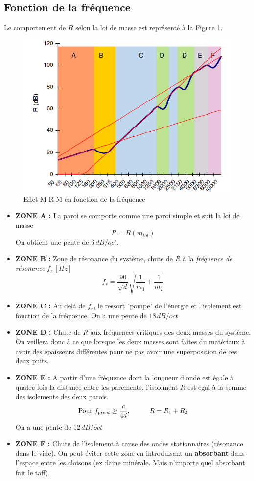 \documentclass[11pt]{report}
\begin{document}
\subsection{Fonction de la fréquence}
Le comportement de $R$ selon la loi de masse est représenté à la Figure \ref{f2}.

\begin{figure}[ht]
\centering
\includegraphics[width=0.8\linewidth]{f2}
\caption{Effet M-R-M en fonction de la fréquence}
\label{f2}
\end{figure}

\begin{itemize}
\item \textbf{ZONE A :} La paroi se comporte comme une paroi simple et suit la loi de masse
$$R=R(m_{tot})$$
On obtient une pente de $6\,dB/oct$.

\item \textbf{ZONE B :} Zone de résonance du système, chute de $R$ à la \textit{fréquence de résonance} $f_r\,[Hz]$
$$f_r =\frac{90}{\sqrt{d}}\sqrt{\frac{1}{m_1}+\frac{1}{m_2}}$$

\item \textbf{ZONE C :} Au delà de $f_r$, le ressort "pompe" de l'énergie et l'isolement est fonction de la fréquence. On a une pente de $18\,dB/oct$

\item \textbf{ZONE D :} Chute de $R$ aux fréquences critiques des deux masses du système. On veillera donc à ce que lorsque les deux masses sont faites du matériaux à avoir des épaisseurs différentes pour ne pas avoir une superposition de ces deux puits.

\item \textbf{ZONE E :} A partir d'une fréquence dont la longueur d'onde est égale à quatre fois la distance entre les parements, l'isolement $R$ est égal à la somme des isolements des deux parois.
$$\textup{Pour } f_{pivot} \ge \frac{c}{4d},\hspace{1cm} R = R_1+R_2$$
On a une pente de $12\,dB/oct$

\item \textbf{ZONE F :} Chute de l'isolement à cause des ondes stationnaires (résonance dans le vide). On peut éviter cette zone en introduisant un \textbf{absorbant} dans l'espace entre les cloisons (ex :laine minérale. Mais n'importe quel absorbant fait le taff).

\end{itemize}
\end{document}
